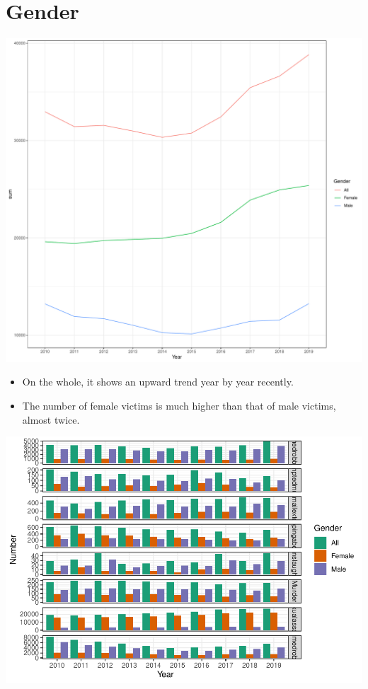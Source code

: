 \documentclass[11pt,a4paper,]{article}
\providecommand{\tightlist}{%
  \setlength{\itemsep}{0pt}\setlength{\parskip}{0pt}}
\begin{document}
\section*{Gender}

\includegraphics{report_files/figure-latex/unnamed-chunk-5-1.pdf}

\begin{itemize}
\tightlist
\item
  On the whole, it shows an upward trend year by year recently.\\
\item
  The number of female victims is much higher than that of male victims, almost twice.
\end{itemize}

\includegraphics{report_files/figure-latex/unnamed-chunk-6-1.pdf}
\end{document}
